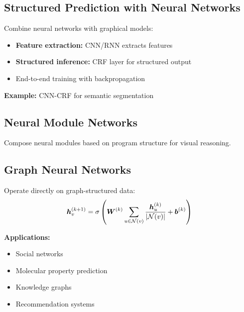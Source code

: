 \subsection{Structured Prediction with Neural Networks}

Combine neural networks with graphical models:
\begin{itemize}
    \item \textbf{Feature extraction:} CNN/RNN extracts features
    \item \textbf{Structured inference:} CRF layer for structured output
    \item End-to-end training with backpropagation
\end{itemize}

\textbf{Example:} CNN-CRF for semantic segmentation

\subsection{Neural Module Networks}

Compose neural modules based on program structure for visual reasoning.

\subsection{Graph Neural Networks}

Operate directly on graph-structured data:
\begin{equation}
\boldsymbol{h}_v^{(k+1)} = \sigma\left(\boldsymbol{W}^{(k)} \sum_{u \in \mathcal{N}(v)} \frac{\boldsymbol{h}_u^{(k)}}{|\mathcal{N}(v)|} + \boldsymbol{b}^{(k)}\right)
\end{equation}

\textbf{Applications:}
\begin{itemize}
    \item Social networks
    \item Molecular property prediction
    \item Knowledge graphs
    \item Recommendation systems
\end{itemize}
